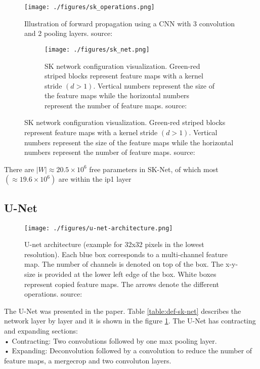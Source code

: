  \begin{figure}[ht!]
         \centering   
        \texttt{[image: ./figures/sk\_operations.png]}
         \caption{Illustration of forward propagation using a CNN with 3 convolution and 2 pooling layers. source: \cite{DBLP:journals/corr/LiZW14}}
\end{figure}


\begin{figure}[ht!]
\ContinuedFloat

 \begin{subfigure}{1\textwidth}
         \centering   
        \texttt{[image: ./figures/sk\_net.png]}
        \caption{SK network configuration visualization. Green-red striped blocks
represent feature maps with a kernel stride $(d > 1)$. Vertical numbers represent the size of the feature maps while the horizontal numbers represent the number of feature maps. source:\cite{DBLP:journals/corr/Tschopp15}}
            \end{subfigure}
    \end{figure}
There are  $ |W| 	\approx 20.5 \times 10^6 $  free parameters \cite{DBLP:journals/corr/Tschopp15} in SK-Net, of which most $ (\approx 19.6 \times 10^6)$ are within the ip1 layer 

\subsection{U-Net} 
\begin{figure}[th!]
        \centering
        \texttt{[image: ./figures/u-net-architecture.png]}
        \caption{U-net architecture (example for 32x32 pixels in the lowest resolution). Each blue box corresponds to a multi-channel feature map. The number of channels is denoted on top of the box. The x-y-size is provided at the lower left edge of the box. White boxes represent copied feature maps. The arrows denote the different operations. source:\cite{DBLP:conf/miccai/RonnebergerFB15}}
        \label{fig:u-net_arch}
    \end{figure}

The U-Net was presented in the \cite{DBLP:conf/miccai/RonnebergerFB15} paper. Table \ref{table:def-sk-net} describes the network layer by layer and it is shown in the figure \ref{fig:u-net_arch}. The U-Net has contracting and expanding sections:\\
• Contracting: Two convolutions followed by one max pooling layer. \\
• Expanding: Deconvolution followed by a convolution to reduce the number of feature maps, a mergecrop and two convoluton layers.


